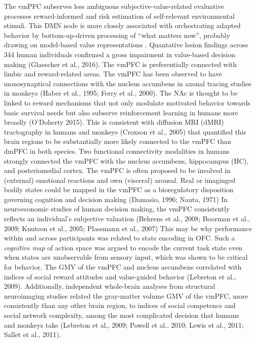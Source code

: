 \documentclass{article} %
\begin{document}
The vmPFC subserves less ambiguous subjective-value-related evaluative processes
reward-informed and risk estimation of self-relevant environmental stimuli.
This DMN node is more closely associated with
orchestrating adapted behavior by bottom-up-driven
processing of “what matters now”,
probably drawing on model-based value representations
\cite{doherty2015structure}.
Quantative lesion findings across 344 human individuals confirmed
a gross impairment in value-based decision making
(Glaescher et al., 2016).
The vmPFC is preferentially connected with limbic and reward-related areas.
The vmPFC has been observed to have monosynaptical connections
with the nucleus accumbens
in axonal tracing studies in monkeys (Haber et al., 1995; Ferry et al., 2000).
The NAc is thought to be linked to reward mechanisms that not
only modulate motivated behavior towards basic survival needs but also
subserve reinforcement learning in humans more broadly
(O'Doherty 2015).
This is consistent with diffusion MRI (dMRI) tractography in humans and monkeys
(Croxson et al., 2005) that
quantified this brain regions to
be substantially more likely connected to the vmPFC than dmPFC in both species.
Two functional connectivity modalities in humans strongly connected
the vmPFC with the nucleus accumbens, hippocampus (HC),
and posteriomedial cortex.
%
The vmPFC is often proposed to be involved in (external) emotional
reactions and own (visceral) arousal.
Real or imaginged bodily states could be mapped in the vmPFC
as a bioregulatory disposition governing cognition
and decision making (Damasio, 1996; Nauta, 1971)
In neuroeconomic studies of human decision making,
the vmPFC consistently reflects an individual’s subjective
valuation (Behrens et al., 2008; Boorman et al., 2009; Knutson et al., 2005; Plassmann et al., 2007)
This may be why performance within and across participants
was related to state encoding in OFC.
Such a \textit{cognitive map} of action space was argued to encode
the current task state even when states are unobservable from sensory input,
which was shown to be critical for behavior.
The GMV of the vmPFC and nucleus accumbens
correlated with indices of social reward attitudes and
value-guided behavior (Lebreton et al., 2009).
Additionally,
independent whole-brain analyses from structural
neuroimaging studies related the gray-matter volume GMV of the vmPFC,
more consistently than any other
brain region, to indices of
social competence and social network complexity,
among the most complicated decision that humans and monkeys take
(Lebreton et al., 2009; Powell et al., 2010; Lewis et al., 2011; Sallet et al., 2011).
%
\end{document}
